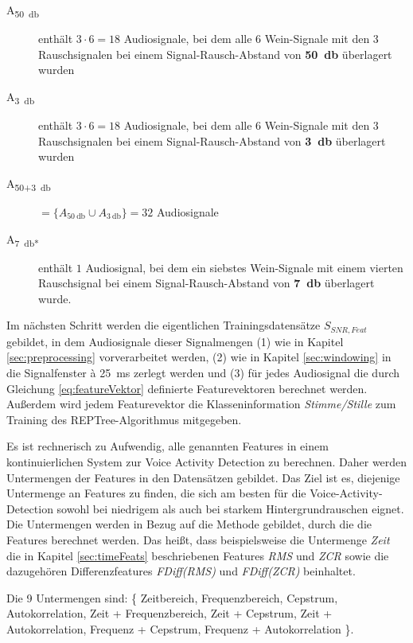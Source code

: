 \begin{description}
	\item[A\textsubscript{\SI{50}{\decibel}}] enthält $3 \cdot 6=18$ Audiosignale, bei dem alle 6 Wein-Signale mit den 3 Rauschsignalen bei einem Signal-Rausch-Abstand von \textbf{\SI{50}{\decibel}} überlagert wurden
	
	\item[A\textsubscript{\SI{3}{\decibel}}] enthält $3 \cdot 6=18$ Audiosignale, bei dem alle 6 Wein-Signale mit den 3 Rauschsignalen bei einem Signal-Rausch-Abstand von \textbf{\SI{3}{\decibel}} überlagert wurden
	
	\item[A\textsubscript{50+\SI{3}{\decibel}}] $ = \{ A_{\SI{50}{\decibel}} \cup  A_{\SI{3}{\decibel}}\} = 32$ Audiosignale
	
	\item[A\textsubscript{\SI{7}{\decibel}*}] enthält $1$ Audiosignal, bei dem ein siebstes Wein-Signale mit einem vierten Rauschsignal bei einem Signal-Rausch-Abstand von \textbf{\SI{7}{\decibel}} überlagert wurde.
	
\end{description}

Im nächsten Schritt werden die eigentlichen Trainingsdatensätze $S_{SNR,Feat}$ gebildet, in dem Audiosignale dieser Signalmengen (1) wie in Kapitel \ref{sec:preprocessing} vorverarbeitet werden, (2) wie in Kapitel \ref{sec:windowing} in die Signalfenster à \SI{25}{\milli\second} zerlegt werden und (3) für jedes Audiosignal die durch Gleichung \ref{eq:featureVektor} definierte Featurevektoren berechnet werden. Außerdem wird jedem Featurevektor die Klasseninformation \emph{Stimme/Stille} zum Training des REPTree-Algorithmus mitgegeben. 

Es ist rechnerisch zu Aufwendig, alle genannten Features in einem kontinuierlichen System zur Voice Activity Detection zu berechnen. Daher werden Untermengen der Features in den Datensätzen gebildet. Das Ziel ist es, diejenige Untermenge an Features zu finden, die sich am besten für die Voice-Activity-Detection sowohl bei niedrigem als auch bei starkem Hintergrundrauschen eignet. Die Untermengen werden in Bezug auf die Methode gebildet, durch die die Features berechnet werden. Das heißt, dass beispielsweise die Untermenge \emph{Zeit} die in Kapitel \ref{sec:timeFeats} beschriebenen Features \emph{RMS} und \emph{ZCR} sowie die dazugehören Differenzfeatures \emph{FDiff(RMS)} und \emph{FDiff(ZCR)} beinhaltet. 

Die 9 Untermengen sind: \{ Zeitbereich, Frequenzbereich, Cepstrum, Autokorrelation, Zeit + Frequenzbereich, Zeit + Cepstrum, Zeit + Autokorrelation, Frequenz + Cepstrum, Frequenz + Autokorrelation \}. 

